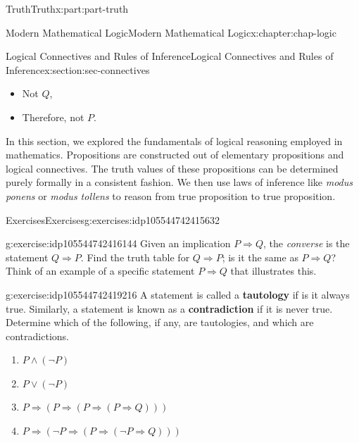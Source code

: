 \documentclass[oneside,10pt,]{book}
\newcommand{\terminology}[1]{\textbf{#1}}
\numberwithin{equation}{section}
\begin{document}
\begin{partptx}{Truth}{}{Truth}{}{}{x:part:part-truth}
\begin{chapterptx}{Modern Mathematical Logic}{}{Modern Mathematical Logic}{}{}{x:chapter:chap-logic}
\begin{sectionptx}{Logical Connectives and Rules of Inference}{}{Logical Connectives and Rules of Inference}{}{}{x:section:sec-connectives}
\begin{itemize}[label=\textbullet]
\item{}Not \(Q\),%
\item{}Therefore, not \(P\).%
\end{itemize}
\begin{conclusion}{}%
In this section, we explored the fundamentals of logical reasoning employed in mathematics. Propositions are constructed out of elementary propositions and logical connectives. The truth values of these propositions can be determined purely formally in a consistent fashion. We then use laws of inference like \emph{modus ponens} or \emph{modus tollens} to reason from true proposition to true proposition.%
\end{conclusion}%
%
%
\typeout{************************************************}
\typeout{************************************************}
%
\begin{exercises-subsection-numberless}{Exercises}{}{Exercises}{}{}{g:exercises:idp105544742415632}
\begin{divisionexercise}{1}{}{}{g:exercise:idp105544742416144}%
Given an implication \(P\Rightarrow Q\), the \emph{converse} is the statement \(Q\Rightarrow P\). Find the truth table for \(Q\Rightarrow P\); is it the same as \(P\Rightarrow Q\)? Think of an example of a specific statement \(P\Rightarrow Q\) that illustrates this.%
\end{divisionexercise}%
\begin{divisionexercise}{2}{}{}{g:exercise:idp105544742419216}%
A statement is called a \terminology{tautology} if is it always true. Similarly, a statement is known as a \terminology{contradiction} if it is never true. Determine which of the following, if any, are tautologies, and which are contradictions.%
%
\begin{enumerate}[label=(\alph*)]
\item{}\(\displaystyle P\land (\neg P)\)%
\item{}\(\displaystyle P\lor (\neg P)\)%
\item{}\(\displaystyle P\Rightarrow (P\Rightarrow (P\Rightarrow (P\Rightarrow Q)))\)%
\item{}\(\displaystyle P\Rightarrow (\neg P\Rightarrow (P\Rightarrow (\neg P\Rightarrow Q)))\)%
\end{enumerate}
\end{divisionexercise}%
\end{exercises-subsection-numberless}
\end{sectionptx}
%
%
\typeout{************************************************}

\end{chapterptx}
\end{partptx}
\end{document}
